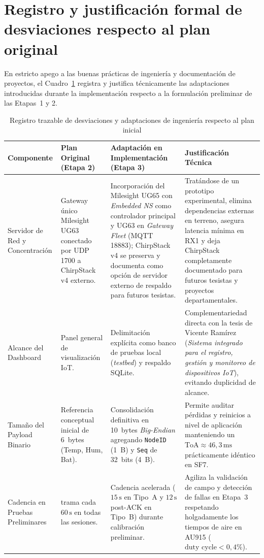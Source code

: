 \documentclass[12pt,oneside,openany,spanish,oldfontcommands]{memoir}
\begin{document}
\section{Registro y justificación formal de desviaciones respecto al plan original}\label{sec:desviaciones-plan}

En estricto apego a las buenas prácticas de ingeniería y documentación de proyectos, el
Cuadro~\ref{tab:desviaciones-plan} registra y justifica técnicamente las adaptaciones introducidas
durante la implementación respecto a la formulación preliminar de las Etapas~1 y 2.

\begin{table}[!htbp]
\centering
\caption{Registro trazable de desviaciones y adaptaciones de ingeniería respecto al plan inicial}
\label{tab:desviaciones-plan}
\scriptsize
\begin{tabularx}{\textwidth}{
    >{\bfseries\raggedright\arraybackslash}p{2.6cm}
    >{\raggedright\arraybackslash}p{3.2cm}
    >{\raggedright\arraybackslash}X
    >{\raggedright\arraybackslash}p{2.9cm}
}
\toprule
\textbf{Componente} & \textbf{Plan Original (Etapa 2)} & \textbf{Adaptación en Implementación (Etapa 3)} & \textbf{Justificación Técnica} \\
\midrule
Servidor de Red y Concentración &
Gateway único Milesight UG63 conectado por UDP 1700 a ChirpStack v4 externo. &
Incorporación del Milesight UG65 con \textit{Embedded NS} como controlador principal y UG63 en \textit{Gateway Fleet} (MQTT 18883); ChirpStack v4 se preserva y documenta como opción de servidor externo de respaldo para futuros tesistas. &
Tratándose de un prototipo experimental, elimina dependencias externas en terreno, asegura latencia mínima en RX1 y deja ChirpStack completamente documentado para futuros tesistas y proyectos departamentales. \\
\midrule
Alcance del Dashboard &
Panel general de visualización IoT. &
Delimitación explícita como banco de pruebas local (\textit{testbed}) y respaldo SQLite. &
Complementariedad directa con la tesis de Vicente Ramírez (\textit{Sistema integrado para el registro, gestión y monitoreo de dispositivos IoT}), evitando duplicidad de alcance. \\
\midrule
Tamaño del Payload Binario &
Referencia conceptual inicial de 6~bytes (Temp, Hum, Bat). &
Consolidación definitiva en 10~bytes \textit{Big-Endian} agregando \texttt{NodeID} (1~B) y \texttt{Seq} de 32~bits (4~B). &
Permite auditar pérdidas y reinicios a nivel de aplicación manteniendo un $\text{ToA} \approx 46,3\,\text{ms}$ prácticamente idéntico en SF7. \\
\midrule
Cadencia en Pruebas Preliminares &
1 trama cada $60\,\text{s}$ en todas las sesiones. &
Cadencia acelerada ($15\,\text{s}$ en Tipo~A y $12\,\text{s}$ post-ACK en Tipo~B) durante calibración preliminar. &
Agiliza la validación de campo y detección de fallas en Etapa~3 respetando holgadamente los tiempos de aire en AU915 ($\text{duty cycle} < 0,4\%$). \\
\bottomrule
\end{tabularx}
\end{table}
\end{document}
